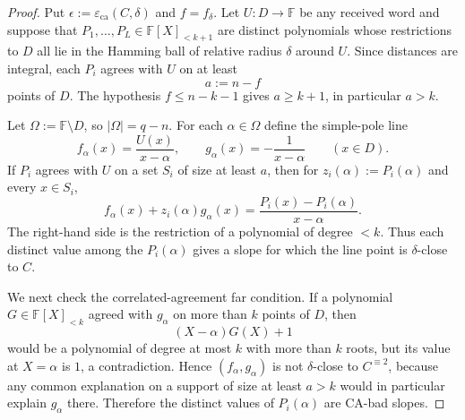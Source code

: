 \documentclass[11pt]{article}
\theoremstyle{definition}
\theoremstyle{remark}
\newcommand{\F}{\mathbb{F}}
\newcommand{\eca}{\varepsilon_{\mathrm{ca}}}
\begin{document}
\begin{proof}
Put $\epsilon:=\eca(C,\delta)$ and $f=f_\delta$.
Let $U:D\to\F$ be any received word and suppose that
$P_1,\ldots,P_L\in\F[X]_{<k+1}$ are distinct polynomials whose
restrictions to $D$ all lie in the Hamming ball of relative radius
$\delta$ around $U$.  Since distances are integral, each $P_i$ agrees
with $U$ on at least
\[
        a:=n-f
\]
points of $D$.  The hypothesis $f\le n-k-1$ gives $a\ge k+1$, in particular
$a>k$.

Let $\Omega:=\F\setminus D$, so $|\Omega|=q-n$.  For each
$\alpha\in\Omega$ define the simple-pole line
\[
        f_\alpha(x)=\frac{U(x)}{x-\alpha},
        \qquad
        g_\alpha(x)=-\frac1{x-\alpha}
        \qquad (x\in D).
\]
If $P_i$ agrees with $U$ on a set $S_i$ of size at least $a$, then for
$z_i(\alpha):=P_i(\alpha)$ and every $x\in S_i$,
\[
        f_\alpha(x)+z_i(\alpha)g_\alpha(x)
        =\frac{P_i(x)-P_i(\alpha)}{x-\alpha}.
\]
The right-hand side is the restriction of a polynomial of degree $<k$.
Thus each distinct value among the $P_i(\alpha)$ gives a slope for
which the line point is $\delta$-close to $C$.

We next check the correlated-agreement far condition.  If a polynomial
$G\in\F[X]_{<k}$ agreed with $g_\alpha$ on more than $k$ points of $D$,
then
\[
        (X-\alpha)G(X)+1
\]
would be a polynomial of degree at most $k$ with more than $k$ roots,
but its value at $X=\alpha$ is $1$, a contradiction.  Hence
$(f_\alpha,g_\alpha)$ is not $\delta$-close to $C^{\equiv2}$, because
any common explanation on a support of size at least $a>k$ would in
particular explain $g_\alpha$ there.  Therefore the distinct values of
$P_i(\alpha)$ are CA-bad slopes.


\end{proof}
\end{document}
